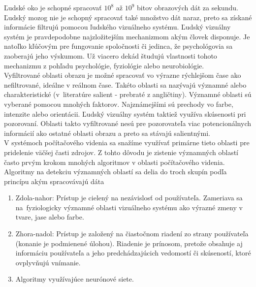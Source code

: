 
Ľudské oko je schopné spracovať \begin{math}10^8\end{math} až \begin{math}10^9\end{math} bitov obrazových dát za sekundu.
Ľudský mozog nie je schopný spracovať také množstvo dát naraz, preto sa získané informácie filtrujú pomocou ľudského vizuálneho systému\cite{Fmph-videnie}.
Ľudský vizuálny systém je pravdepodobne najzložitejším mechanizmom akým človek disponuje.
Je natoľko kľúčovým pre fungovanie spoločnosti či jedinca, že psychológovia sa zaoberajú jeho výskumom.
Už viacero dekád študujú vlastnosti tohoto mechanizmu z pohľadu psychológie, fyziológie alebo neurobiológie.
\\
Vyfiltrované oblasti obrazu je možné spracovať vo výrazne rýchlejšom čase ako nefiltrované, ideálne v reálnom čase.
Takéto oblasti sa nazývajú významné alebo charakteristické (v~literatúre salient - prebraté z angličtiny).
Významné oblasti sú vyberané pomocou mnohých faktorov.
Najznámejšími sú prechody vo farbe, intenzite alebo orientácii.
Ľudský vizuálny systém taktiež využíva skúsenosti pri pozorovaní.
Oblasti takto vyfiltrované nesú pre pozorovateľa viac potencionálnych informácií ako ostatné oblasti obrazu a preto sa stávajú salientnými.
\\
V systémoch počítačového videnia sa snažíme využívať primárne tieto oblasti pre pridelenie väčšej časti zdrojov.
Z tohto dôvodu je zistenie významných oblastí často prvým krokom mnohých algoritmov v oblasti počítačového videnia.
\\
Algoritmy na detekciu významných oblastí sa delia do troch skupín podľa princípu akým spracovávajú dáta\cite{brief-survey}

  \begin{enumerate}
          \item Zdola-nahor: Prístup je cielený na nezávislosť od používateľa.
          Zameriava sa na~fyziologicky významné oblasti vizuálneho systému ako výrazné zmeny v tvare, jase alebo farbe.
          \item Zhora-nadol: Prístup je založený na čiastočnom riadení zo strany používateľa (konanie je podmienené úlohou).
          Riadenie je prínosom, pretože obsahuje aj informáciu používateľa a jeho predchádzajúcich vedomostí či skúseností, ktoré ovplyvňujú vnímanie.
          \item Algoritmy využívajúce neurónové siete.
  \end{enumerate}

